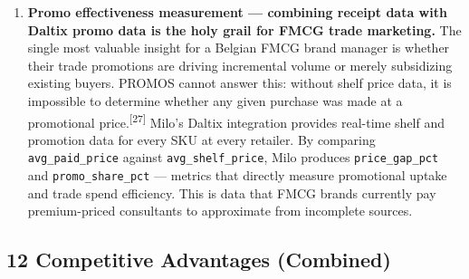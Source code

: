 \documentclass[11pt,a4paper]{article}
\begin{document}
\begin{enumerate}[leftmargin=1.5em, itemsep=6pt]
  \item \textbf{Promo effectiveness measurement --- combining receipt data with Daltix promo data is the holy grail for FMCG trade marketing.}
  The single most valuable insight for a Belgian FMCG brand manager is whether their trade promotions are driving incremental volume or merely subsidizing existing buyers. PROMOS cannot answer this: without shelf price data, it is impossible to determine whether any given purchase was made at a promotional price.\textsuperscript{[27]} Milo's Daltix integration provides real-time shelf and promotion data for every SKU at every retailer. By comparing \texttt{avg\_paid\_price} against \texttt{avg\_shelf\_price}, Milo produces \texttt{price\_gap\_pct} and \texttt{promo\_share\_pct} --- metrics that directly measure promotional uptake and trade spend efficiency. This is data that FMCG brands currently pay premium-priced consultants to approximate from incomplete sources.

\end{enumerate}

\subsection{12 Competitive Advantages (Combined)}
\end{document}
